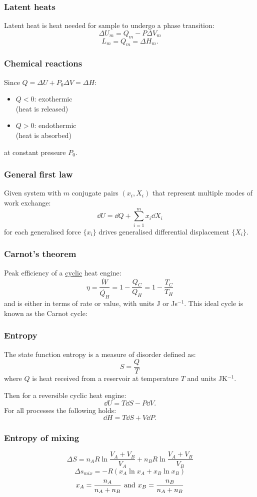 \documentclass{article}
\begin{document}
\begin{multicols*}{3}
\subsubsection*{Latent heats}
Latent heat is heat needed for sample
to undergo a phase transition:
$$\Delta U_m=Q_m-P\Delta V_m$$
$$L_m=Q_m=\Delta H_m.$$

\subsubsection*{Chemical reactions}
Since
$Q=\Delta U+P_0\Delta V=\Delta H$:
\begin{itemize}
    \item $Q<0$: exothermic \\
    (heat is released)
    \item $Q>0$: endothermic \\
    (heat is absorbed)
\end{itemize}
at constant pressure $P_0$.

\subsubsection*{General first law}
Given system with $m$ conjugate pairs
$(x_i,X_i)$ that represent multiple modes
of work exchange:
$$\dd U=\dd Q+
\sum_{i=1}^{m}x_i\dd X_i$$
for each generalised force $\{x_i\}$ 
drives generalised differential
displacement $\{X_i\}$.

\subsubsection*{Carnot's theorem}
Peak efficiency of a \underline{cyclic}
heat engine:
$$\eta=\frac{\dot{W}}{\dot{Q_H}}=1-\frac{Q_C}{Q_H}
=1-\frac{T_C}{T_H}$$
and is either in terms of rate or value, 
with units J or Js$^{-1}$.
This ideal cycle is known as
the Carnot cycle:

\subsubsection*{Entropy}
The state function entropy is a measure
of disorder defined as:
$$S=\frac{Q}{T}$$
where $Q$ is heat received from a reservoir
at temperature $T$
and units JK$^{-1}$.

Then for a reversible cyclic heat engine:
$$\dd U=T\dd S-P\dd V.$$
For all processes the following holds:
$$\dd H=T\dd S+V\dd P.$$

\subsubsection*{Entropy of mixing}
$$\Delta S=n_A R\ln\frac{V_A+V_B}{V_A}
+n_B R\ln\frac{V_A+V_B}{V_B}$$
$$\Delta s_{mix}=-R(x_A\ln x_A+x_B\ln x_B)$$
$$x_A=\frac{n_A}{n_A+n_B}
\hspace{0.05in}\text{and}\hspace{0.05in}
x_B=\frac{n_B}{n_A+n_B}$$


\end{multicols*}
\end{document}

